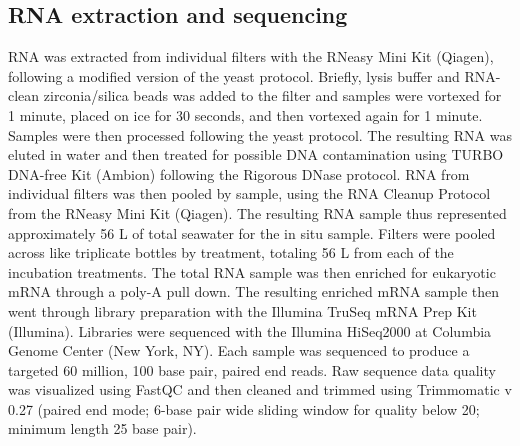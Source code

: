 \subsection{RNA extraction and sequencing}
RNA was extracted from individual filters with the RNeasy Mini Kit (Qiagen), following a modified version of the yeast protocol. Briefly, lysis buffer and RNA-clean zirconia/silica beads was added to the filter and samples were vortexed for 1 minute, placed on ice for 30 seconds, and then vortexed again for 1 minute. Samples were then processed following the yeast protocol. The resulting RNA was eluted in water and then treated for possible DNA contamination using TURBO DNA-free Kit (Ambion) following the Rigorous DNase protocol. RNA from individual filters was then pooled by sample, using the RNA Cleanup Protocol from the RNeasy Mini Kit (Qiagen). The resulting RNA sample thus represented approximately 56 L of total seawater for the in situ sample. Filters were pooled across like triplicate bottles by treatment, totaling 56 L from each of the incubation treatments. The total RNA sample was then enriched for eukaryotic mRNA through a poly-A pull down. The resulting enriched mRNA sample then went through library preparation with the Illumina TruSeq mRNA Prep Kit (Illumina). Libraries were sequenced with the Illumina HiSeq2000 at Columbia Genome Center (New York, NY). Each sample was sequenced to produce a targeted 60 million, 100 base pair, paired end reads. Raw sequence data quality was visualized using FastQC and then cleaned and trimmed using Trimmomatic v 0.27 (paired end mode; 6-base pair wide sliding window for quality below 20; minimum length 25 base pair). 
